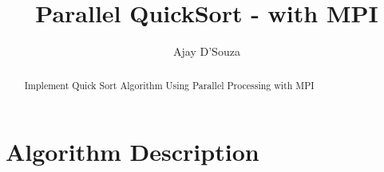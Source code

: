 \documentclass[twoside,11pt]{article}\usepackage{amsmath,amsfonts,amsthm,fullpage}
\title{Parallel QuickSort - with MPI}
\author{Ajay D'Souza}
\date{}
\begin{document}
\maketitle



\begin{abstract}
Implement Quick Sort Algorithm Using Parallel Processing with MPI
\end{abstract}

\pagebreak
\tableofcontents

\pagebreak
\listoffigures


\pagebreak

%
%
\section{Algorithm Description}
\label{algorithm}
\end{document}
